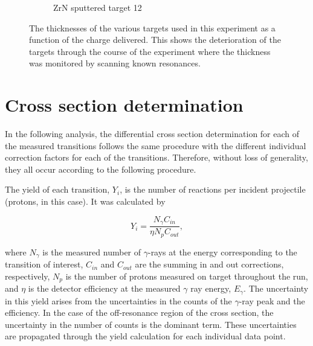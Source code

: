\begin{figure}
\begin{subfigure}[b]{0.475\textwidth}
            \caption[ZrN sputtered target 12]%
            {{\small ZrN sputtered target 12}}    
            \label{fig: target12}
        \end{subfigure}
        \caption[ The thicknesses of the various targets used in this experiment as a function of the charge delivered. This shows the deterioration of the targets through the course of the experiment where the thickness was monitored by scanning known resonances. ]
        {\small The thicknesses of the various targets used in this experiment as a function of the charge delivered. This shows the deterioration of the targets through the course of the experiment where the thickness was monitored by scanning known resonances. } 
        \label{fig: targetThicknesses}
\end{figure}




\section{Cross section determination}
\label{sec: cross-section}


In the following analysis, the differential cross section determination for each of the measured transitions follows the same procedure with the different individual correction factors for each of the transitions. Therefore, without loss of generality, they all occur according to the following procedure.

The yield of each transition, $Y_{i}$, is the number of reactions per incident projectile (protons, in this case). It was calculated by 

\begin{equation}
Y_{i} = \dfrac{N_{\gamma} C_{in}}{\eta N_{p} C_{out}},
\label{eqn: yieldCalc}
\end{equation}

\noindent where $N_{\gamma}$ is the measured number of $\gamma$-rays at the energy corresponding to the transition of interest, $C_{in}$ and $C_{out}$ are the summing in and out corrections, respectively, $N_{p}$ is the number of protons measured on target throughout the run, and $\eta$ is the detector efficiency at the measured $\gamma$ ray energy, $E_{\gamma}$. The uncertainty in this yield arises from the uncertainties in the counts of the $\gamma$-ray peak and the efficiency. In the case of the off-resonance region of the cross section, the uncertainty in the number of counts is the dominant term. These uncertainties are propagated through the yield calculation for each individual data point.

